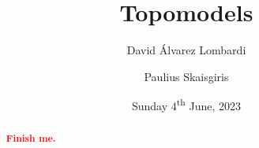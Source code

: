 \documentclass[12pt,a4paper]{article}
\title{Topomodels}
\author{David Álvarez Lombardi \and Paulius Skaisgiris}
\date{Sunday 4\textsuperscript{th} June, 2023}
\begin{document}
\maketitle

\begin{abstract}
\textcolor{red}{\textbf{Finish me.}}
\end{abstract}

\vfill

\tableofcontents

\clearpage


















\end{document}
